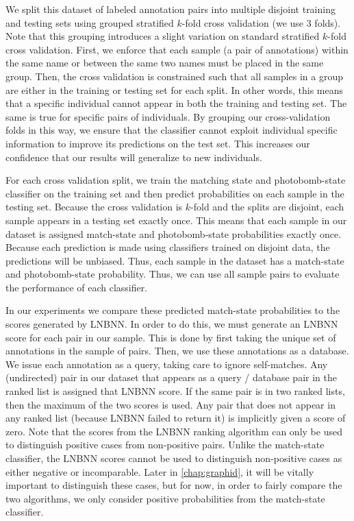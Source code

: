     We split this dataset of labeled annotation pairs into multiple disjoint training and testing sets using
      grouped stratified $k$-fold cross validation (we use $3$ folds).
    Note that this grouping introduces a slight variation on standard stratified $k$-fold cross validation.
    First, we enforce that each sample (a pair of annotations) within the same name or between the same two names
      must be placed in the same group.
    Then, the cross validation is constrained such that all samples in a group are either in the training or
      testing set for each split.
    In other words, this means that a specific individual cannot appear in both the training and testing set.
    The same is true for specific pairs of individuals.
    By grouping our cross-validation folds in this way, we ensure that the classifier cannot exploit individual
      specific information to improve its predictions on the test set.
    This increases our confidence that our results will generalize to new individuals.

    For each cross validation split, we train the matching state and photobomb-state classifier on the training
      set and then predict probabilities on each sample in the testing set.
    Because the cross validation is $k$-fold and the splits are disjoint, each sample appears in a testing set
      exactly once.
    This means that each sample in our dataset is assigned match-state and photobomb-state probabilities exactly
      once.
    Because each prediction is made using classifiers trained on disjoint data, the predictions will be unbiased.
    Thus, each sample in the dataset has a match-state and photobomb-state probability.
    Thus, we can use all sample pairs to evaluate the performance of each classifier.

    In our experiments we compare these predicted match-state probabilities to the scores generated by LNBNN.
    In order to do this, we must generate an LNBNN score for each pair in our sample.
    This is done by first taking the unique set of annotations in the sample of pairs.
    Then, we use these annotations as a database.
    We issue each annotation as a query, taking care to ignore self-matches.
    Any (undirected) pair in our dataset that appears as a query / database pair in the ranked list is assigned
      that LNBNN score.
    If the same pair is in two ranked lists, then the maximum of the two scores is used.
    Any pair that does not appear in any ranked list (because LNBNN failed to return it) is implicitly given a
      score of zero.
    Note that the scores from the LNBNN ranking algorithm can only be used to distinguish positive cases from
      non-positive pairs.
    Unlike the match-state classifier, the LNBNN scores cannot be used to distinguish non-positive cases as
      either negative or incomparable.
    Later in \cref{chap:graphid}, it will be vitally important to distinguish these cases, but for now, in order
      to fairly compare the two algorithms, we only consider positive probabilities from the match-state
      classifier.

